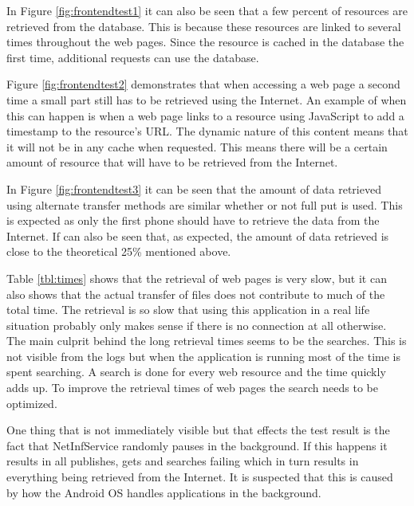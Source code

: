 In Figure \ref{fig:frontendtest1} it can also be seen that a few percent of resources are retrieved from the database. This is because these resources are linked to several times throughout the web pages. Since the resource is cached in the database the first time, additional requests can use the database.

Figure \ref{fig:frontendtest2} demonstrates that when accessing a web page a second time a small part still has to be retrieved using the Internet. An example of when this can happen is when a web page links to a resource using JavaScript to add a timestamp to the resource's URL. The dynamic nature of this content means that it will not be in any cache when requested. This means there will be a certain amount of resource that will have to be retrieved from the Internet.

In Figure \ref{fig:frontendtest3} it can be seen that the amount of data retrieved using alternate transfer methods are similar whether or not full put is used. This is expected as only the first phone should have to retrieve the data from the Internet. If can also be seen that, as expected, the amount of data retrieved is close to the theoretical 25\% mentioned above.

Table \ref{tbl:times} shows that the retrieval of web pages is very slow, but it can also shows that the actual transfer of files does not contribute to much of the total time. The retrieval is so slow that using this application in a real life situation probably only makes sense if there is no connection at all otherwise. The main culprit behind the long retrieval times seems to be the searches. This is not visible from the logs but when the application is running most of the time is spent searching. A search is done for every web resource and the time quickly adds up. To improve the retrieval times of web pages the search needs to be optimized.

One thing that is not immediately visible but that effects the test result is the fact that NetInfService randomly pauses in the background. If this happens it results in all publishes, gets and searches failing which in turn results in everything being retrieved from the Internet. It is suspected that this is caused by how the Android OS handles applications in the background.